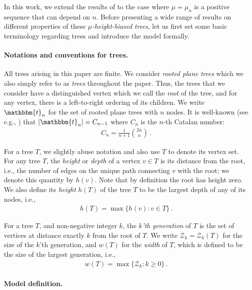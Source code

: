\documentclass{article}
\newcommand{\bbt}{\mathbbm{t}}
\newcommand{\1}{\mathbbm{1}}								%
\theoremstyle{definition}
\numberwithin{equation}{section}
\newcommand{\cZ}{\mathcal Z}
\begin{document}
In this work, we extend the results of \cite{durhuus2023trees} to the case where $\mu=\mu_n$ is a positive sequence that can depend on $n$. Before presenting a wide range of results on different properties of these \emph{$\mu$-height-biased trees}, let us {first set some basic terminology regarding trees and} introduce the model formally. 

\paragraph{Notations and conventions for trees.} All trees arising in this paper are finite. We consider \emph{rooted plane trees} which we also simply refer to as \emph{trees} throughout the paper. {Thus, the trees that we consider {have} a distinguished vertex which we call the \emph{root} of the tree, and for any vertex, there is a left-to-right ordering of its children.}
We write $\bbt_n$ for the set of rooted plane trees with $n$ nodes.
It is well-known (see e.g., \cite[Chapter 1]{drmota2009random}) that $|\bbt_n|=C_{n-1}$ where $C_n$ is the $n$-th Catalan number:
\begin{align}\label{eq:catalan}
    C_n=\frac{1}{n+1}\binom{2n}{n}\,.
\end{align}

{For a tree $T$, we slightly abuse notation and also use $T$ to denote its vertex set. For any tree $T$, the  \emph{height} or \emph{depth} of a vertex $v \in T$ is its distance from the root, i.e., the number of edges on the unique path connecting $v$ with the root; we denote this quantity by $h(v)$. Note that by definition the root has height zero.} We also define its \emph{height} $h(T)$ of the tree $T$ to be the largest depth of any of its nodes, {i.e.,
\begin{align*}
    h(T)=\max\Big\{h(v):v\in T\Big\}\,.
\end{align*}
}

{For a tree $T$, 
and non-negative integer $k$, the {\em $k$'th generation} of $T$ is the set of vertices at distance exactly $k$ from the root of $T$. We write $\cZ_k=\cZ_k(T)$ for the size of the $k$'th generation, and $w(T)$ for the {\em width}  of $T$, which is defined to be the size of the largest generation, i.e.,
\begin{align}\label{eq:def width}
    w(T)=\max\Big\{\cZ_k:k\geq 0\Big\}\,.
\end{align}
}

\paragraph{Model definition.}
\end{document}
